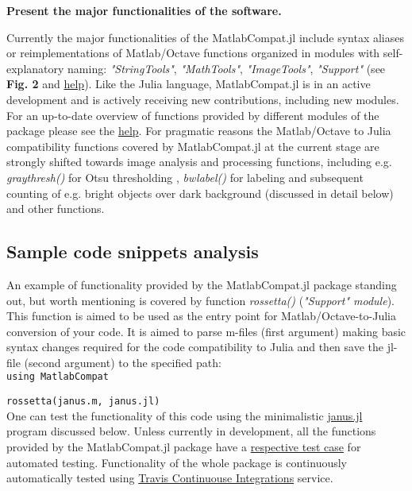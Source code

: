 \textbf{Present the major functionalities of the software.}

Currently the major functionalities of the MatlabCompat.jl include syntax aliases or reimplementations of Matlab/Octave functions organized in modules with self-explanatory naming: \textit{"StringTools"}, \textit{"MathTools"}, \textit{"ImageTools"}, \textit{"Support"} (see \textbf{Fig. 2} and \href{http://matlabcompat.github.io/help.html}{help}). Like the Julia language, MatlabCompat.jl is in an active development and is actively receiving new contributions, including new modules. For an up-to-date overview of functions provided by different modules of the package please see the \href{http://matlabcompat.github.io/help.html}{help}. For pragmatic reasons the Matlab/Octave to Julia compatibility functions covered by MatlabCompat.jl at the current stage are strongly shifted towards image analysis and processing functions, including e.g. \textit{graythresh()} for Otsu thresholding \cite{otsu1975threshold}, \textit{bwlabel()} for labeling and subsequent counting of e.g. bright objects over dark background (discussed in detail below) and other functions.

\subsection{Sample code snippets analysis}

An example of functionality provided by the MatlabCompat.jl package standing out, but worth mentioning is covered by function \textit{rossetta()} (\textit{"Support" module}). This function is aimed to be used as the entry point for Matlab/Octave-to-Julia conversion of your code. It is aimed to parse m-files (first argument) making basic syntax changes required for the code compatibility to Julia and then save the jl-file (second argument) to the specified path:\\

\verb|using MatlabCompat|

\verb|rossetta(janus.m, janus.jl)|\\

One can test the functionality of this code using the minimalistic \href{https://github.com/MatlabCompat/MatlabCompat.jl/blob/dev/test/janus.m}{janus.jl} program discussed below. Unless currently in development, all the functions provided by the MatlabCompat.jl package have a \href{https://github.com/MatlabCompat/MatlabCompat.jl/tree/master/test}{respective test case} for automated testing. Functionality of the whole package is continuously automatically tested using \href{https://travis-ci.org/MatlabCompat/MatlabCompat.jl}{Travis Continuouse Integrations} service.
